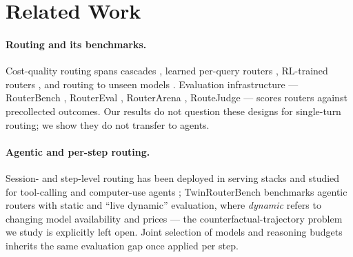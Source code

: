 \documentclass{article}
\begin{document}
\section{Related Work}

\paragraph{Routing and its benchmarks.} Cost-quality routing spans cascades \citep{chen2023frugalgpt,aggarwal2024automix}, learned per-query routers \citep{ong2024routellm,ding2024hybrid}, RL-trained routers \citep{li2025routerr1}, and routing to unseen models \citep{jitkrittum2025uniroute}. Evaluation infrastructure --- RouterBench \citep{hu2024routerbench}, RouterEval \citep{huang2025routereval}, RouterArena \citep{routerarena2025}, RouteJudge \citep{routejudge2026} --- scores routers against precollected outcomes. Our results do not question these designs for single-turn routing; we show they do not transfer to agents.

\paragraph{Agentic and per-step routing.} Session- and step-level routing has been deployed in serving stacks \citep{vllm2026saar} and studied for tool-calling and computer-use agents \citep{switchcraft2026,cua2026steplevel}; TwinRouterBench \citep{twinrouterbench2026} benchmarks agentic routers with static and ``live dynamic'' evaluation, where \emph{dynamic} refers to changing model availability and prices --- the counterfactual-trajectory problem we study is explicitly left open. Joint selection of models and reasoning budgets \citep{pan2025rtr,odar2026} inherits the same evaluation gap once applied per step.
\end{document}
